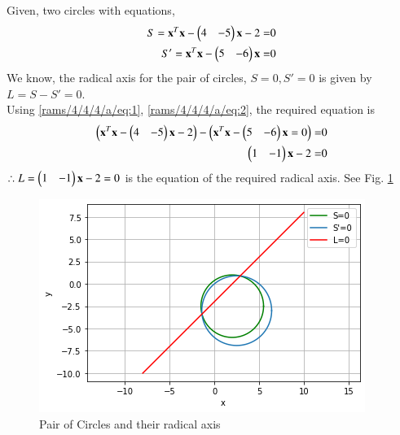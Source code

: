 
Given, two circles with equations,
\begin{align}
S=\mathbf{x}^{T}\mathbf{x}-\begin{pmatrix}4 & -5\end{pmatrix}\mathbf{x}-2=&0\label{rams/4/4/4/a/eq:1}\\
S'=\mathbf{x}^{T}\mathbf{x}-\begin{pmatrix}5 & -6\end{pmatrix}\mathbf{x}=&0\label{rams/4/4/4/a/eq:2}
\end{align}
We know, the radical axis for the pair of circles, $S=0, S'=0$ is given by $L=S-S'=0$.\\
Using \eqref{rams/4/4/4/a/eq:1}, \eqref{rams/4/4/4/a/eq:2}, the required equation is
\begin{align}
\left(\mathbf{x}^{T}\mathbf{x}-\begin{pmatrix}4 & -5\end{pmatrix}\mathbf{x}-2\right)-\left(\mathbf{x}^{T}\mathbf{x}-\begin{pmatrix}5 & -6\end{pmatrix}\mathbf{x}=0\right)=&0\\
\begin{pmatrix}1 & -1\end{pmatrix}\mathbf{x}-2=&0
\end{align}
$\therefore L=\begin{pmatrix}1 & -1\end{pmatrix}\mathbf{x}-2=0$ is the equation of the required radical axis.  See Fig.  \ref{rams/4/4/4/a/plot}
\begin{figure}[!h]
 \centering
 \includegraphics[width=\columnwidth]{solutions/4/4/4/a/figures/Assignment3.png}
 \caption{Pair of Circles and their radical axis}
 \label{rams/4/4/4/a/plot}
\end{figure}
